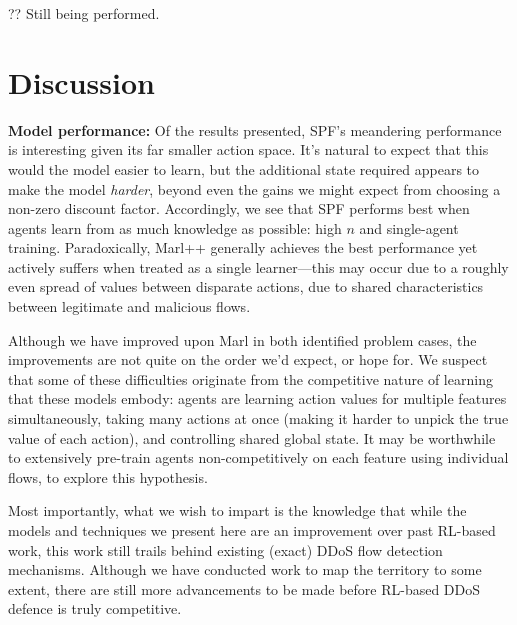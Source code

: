 \documentclass[conference, letterpaper, 10pt, times]{IEEEtran}
\newcommand{\fakepara}[1]{\noindent\textbf{#1:}}
\begin{document}
?? Still being performed.

\section{Discussion}\label{sec:discussion}


\fakepara{Model performance}
Of the results presented, SPF's meandering performance is interesting given its far smaller action space.
It's natural to expect that this would the model easier to learn, but the additional state required appears to make the model \emph{harder}, beyond even the gains we might expect from choosing a non-zero discount factor.
Accordingly, we see that SPF performs best when agents learn from as much knowledge as possible: high $n$ and single-agent training.
Paradoxically, Marl++ generally achieves the best performance yet actively suffers when treated as a single learner---this may occur due to a roughly even spread of values between disparate actions, due to shared characteristics between legitimate and malicious flows.

Although we have improved upon Marl in both identified problem cases, the improvements are not quite on the order we'd expect, or hope for.
We suspect that some of these difficulties originate from the competitive nature of learning that these models embody: agents are learning action values for multiple features simultaneously, taking many actions at once (making it harder to unpick the true value of each action), and controlling shared global state.
It may be worthwhile to extensively pre-train agents non-competitively on each feature using individual flows, to explore this hypothesis.


Most importantly, what we wish to impart is the knowledge that while the models and techniques we present here are an improvement over past RL-based work, this work still trails behind existing (exact) DDoS flow detection mechanisms.
Although we have conducted work to map the territory to some extent, there are still more advancements to be made before RL-based DDoS defence is truly competitive.
\end{document}
